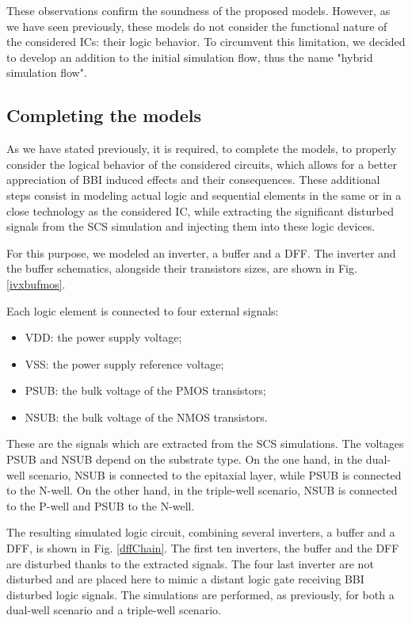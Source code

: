 	These observations confirm the soundness of the proposed models.
	However, as we have seen previously, these models do not consider the functional nature of the considered ICs: their logic behavior.
	To circumvent this limitation, we decided to develop an addition to the initial simulation flow, thus the name "hybrid simulation flow".

\subsection{Completing the models}
	As we have stated previously, it is required, to complete the models, to properly consider the logical behavior of the considered circuits, which allows for a better appreciation of BBI induced effects and their consequences.
	These additional steps consist in modeling actual logic and sequential elements in the same or in a close technology as the considered IC, while extracting the significant disturbed signals from the SCS simulation and injecting them into these logic devices.
	
	For this purpose, we modeled an inverter, a buffer and a DFF.
	The inverter and the buffer schematics, alongside their transistors sizes, are shown in Fig. \ref{ivxbufmos}.
%	

	Each logic element is connected to four external signals:
	\begin{itemize}
		\item VDD: the power supply voltage;
		\item VSS: the power supply reference voltage;
		\item PSUB: the bulk voltage of the PMOS transistors;
		\item NSUB: the bulk voltage of the NMOS transistors.
	\end{itemize}
	These are the signals which are extracted from the SCS simulations.
	The voltages PSUB and NSUB depend on the substrate type.
	On the one hand, in the dual-well scenario, NSUB is connected to the epitaxial layer, while PSUB is connected to the N-well.
	On the other hand, in the triple-well scenario, NSUB is connected to the P-well and PSUB to the N-well.
	
	The resulting simulated logic circuit, combining several inverters, a buffer and a DFF, is shown in Fig. \ref{dffChain}.
	The first ten inverters, the buffer and the DFF are disturbed thanks to the extracted signals.
	The four last inverter are not disturbed and are placed here to mimic a distant logic gate receiving BBI disturbed logic signals.
	The simulations are performed, as previously, for both a dual-well scenario and a triple-well scenario.
